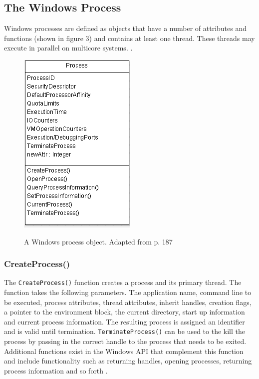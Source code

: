 \documentclass[12pt,a4paper,oneside]{article}
\def\code#1{\texttt{#1}}
\begin{document}
\begin{spacing}{1.4}
\subsection{The Windows Process}
Windows processes are defined as objects that have a number of attributes and functions (shown in figure 3) and contains at least one thread. These threads may execute in parallel on multicore systems. \citep{OSInternals&DesignPrinciplesStallings}.

\begin{figure}[H]
\includegraphics{procObj}
\label{fig:procObj}
\caption{A Windows process object. Adapted from \cite{OSInternals&DesignPrinciplesStallings} p. 187} 
\end{figure}

\subsubsection{CreateProcess()}
The \code{CreateProcess()} function creates a process and its primary thread. The function takes the following parameters. The application name, command line to be executed, process attributes, thread attributes, inherit handles, creation flags, a pointer to the environment block, the current directory, start up information and current process information. The resulting process is assigned an identifier and is valid until termination. \code{TerminateProcess()} can be used to the kill the process by passing in the correct handle to the process that needs to be exited. Additional functions exist in the Windows API that complement this function and include functionality such as returning handles, opening processes, returning process information and so forth \citep{MSDN_API}.


\end{spacing}
\end{document}
